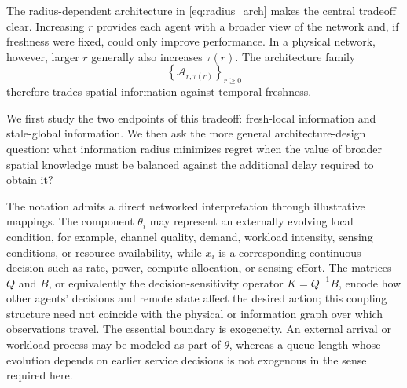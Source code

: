 \documentclass[11pt]{article}
\begin{document}
The radius-dependent architecture in \eqref{eq:radius_arch} makes the central
tradeoff clear. Increasing $r$ provides each agent with a broader
view of the network and, if freshness were fixed, could only improve
performance. In a physical network, however, larger $r$ generally also
increases $\tau(r)$. The architecture family
\begin{equation}
    \left\{
        \mathcal{A}_{r,\tau(r)}
    \right\}_{r\ge0}
    \label{eq:architecture_family}
\end{equation}
therefore trades spatial information against temporal freshness.

We first study the two endpoints of this tradeoff: fresh-local information and
stale-global information. We then ask the more general architecture-design
question: what information radius minimizes regret when the value of broader
spatial knowledge must be balanced against the additional delay required to
obtain it?

The notation admits a direct networked interpretation through illustrative
mappings. The component $\theta_i$
may represent an externally evolving local condition, for example, channel
quality, demand, workload intensity, sensing conditions, or resource
availability, while $x_i$ is a corresponding continuous decision such as
rate, power, compute allocation, or sensing effort.  The matrices $Q$ and $B$,
or equivalently the decision-sensitivity operator $K=Q^{-1}B$, encode how other
agents' decisions and remote state affect the desired action; this coupling
structure need not coincide with the physical or information graph over which
observations travel.  The essential boundary is exogeneity.  An external
arrival or workload process may be modeled as part of $\theta$, whereas a queue
length whose evolution depends on earlier service decisions is not exogenous
in the sense required here.
\end{document}
